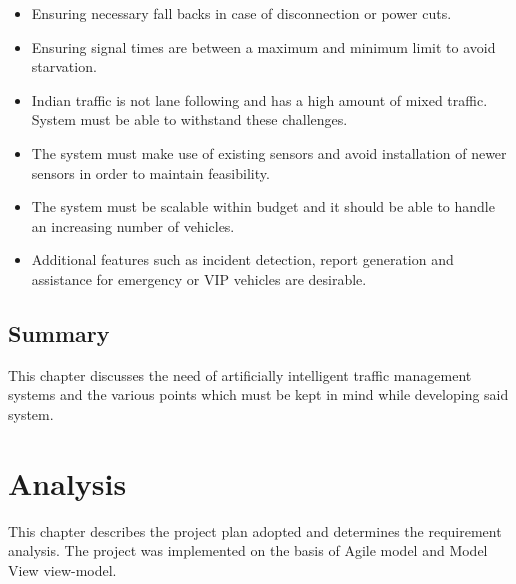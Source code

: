\documentclass[openany,12pt]{report}
\begin{document}
	\begin{itemize}
		\item{Ensuring necessary fall backs in case of disconnection or power cuts.}
		\item{Ensuring signal times are between a maximum and minimum limit to avoid starvation.}
		\item{Indian traffic is not lane following and has a high amount of mixed traffic. System must be able to withstand these challenges.}
		\item{The system must make use of existing sensors and avoid installation of newer sensors in order to maintain feasibility.}
		\item{The system must be scalable within budget and it should be able to handle an increasing number of vehicles.}
		\item{Additional features such as incident detection, report generation and assistance for emergency or VIP vehicles are desirable.}
	\end{itemize}
	
	
	
	\section{Summary}
	\hspace*{0.5in}This chapter discusses the need of artificially intelligent traffic management systems and the various points which must be kept in mind while developing said system.\\
	
	
	\chapter{Analysis}

	
	\hspace*{0.5 in}This chapter describes the project plan adopted and determines the requirement analysis. The project was implemented on the basis of Agile model and Model View view-model.
	
\end{document}
